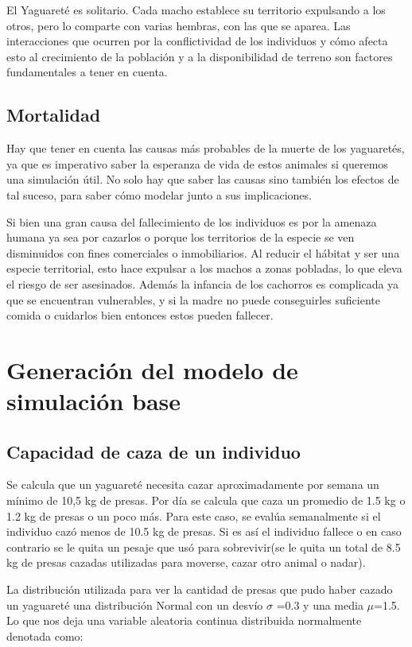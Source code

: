     El Yaguareté es solitario. Cada macho establece su territorio expulsando a los otros, pero lo comparte con varias hembras, con las que se aparea. Las interacciones que ocurren por la conflictividad de los individuos y cómo afecta esto al crecimiento de la población y a la disponibilidad de terreno son factores fundamentales a tener en cuenta.
    
    \subsection{Mortalidad}
    Hay que tener en cuenta las causas más probables de la muerte de los yaguaretés, ya que es imperativo saber la esperanza de vida de estos animales si queremos una simulación útil. No solo hay que saber las causas sino también los efectos de tal suceso, para saber cómo modelar junto a sus implicaciones.
    
    Si bien una gran causa del fallecimiento de los individuos es por la amenaza humana ya sea por cazarlos o porque los territorios de la especie se ven disminuidos con fines comerciales o inmobiliarios. Al reducir el hábitat y ser una especie territorial, esto hace expulsar a los machos a zonas pobladas, lo que eleva el riesgo de ser asesinados.
    Además la infancia de los cachorros es complicada ya que se encuentran vulnerables, y si la madre no puede conseguirles suficiente comida o cuidarlos bien entonces estos pueden fallecer.

\section{Generación del modelo de simulación base}
    \subsection{Capacidad de caza de un individuo}
    Se calcula que un yaguareté necesita cazar aproximadamente por semana un mínimo de 10,5 kg de presas. Por día se calcula que caza un promedio de 1.5 kg o 1.2 kg de presas o un poco más. Para este caso, se evalúa semanalmente si el individuo cazó menos de 10.5 kg de presas. Si es así el individuo fallece o en caso contrario se le quita un pesaje que usó para sobrevivir(se le quita un total de 8.5 kg de presas cazadas utilizadas para moverse, cazar otro animal o nadar).
    
    La distribución utilizada para ver la cantidad de presas que pudo haber cazado un yaguareté una distribución Normal con un desvío $\sigma$ =0.3 y una media $\mu$=1.5. Lo que nos deja una variable aleatoria continua distribuida normalmente denotada como:

